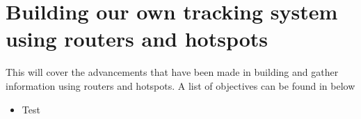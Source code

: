 \section{Building our own tracking system using routers and hotspots}
This will cover the advancements that have been made in building and gather information using routers and hotspots. A list of objectives can be found in below

\begin{itemize}
	\item Test
\end{itemize}